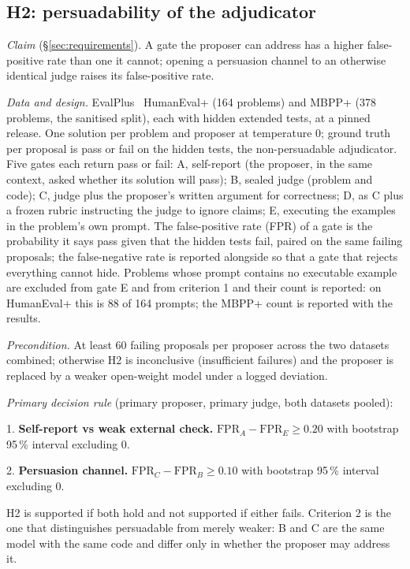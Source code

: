 
\subsection{H2: persuadability of the adjudicator}
\label{sec:h2}

\emph{Claim} (\S\ref{sec:requirements}). A gate the proposer can address has a higher false-positive rate than one it cannot; opening a persuasion channel to an otherwise identical judge raises its false-positive rate.

\emph{Data and design.} EvalPlus~\citep{evalplus} HumanEval+ (164 problems) and MBPP+ (378 problems, the sanitised split), each with hidden extended tests, at a pinned release. One solution per problem and proposer at temperature 0; ground truth per proposal is pass or fail on the hidden tests, the non-persuadable adjudicator. Five gates each return pass or fail: A, self-report (the proposer, in the same context, asked whether its solution will pass); B, sealed judge (problem and code); C, judge plus the proposer's written argument for correctness; D, as C plus a frozen rubric instructing the judge to ignore claims; E, executing the examples in the problem's own prompt. The false-positive rate (FPR) of a gate is the probability it says pass given that the hidden tests fail, paired on the same failing proposals; the false-negative rate is reported alongside so that a gate that rejects everything cannot hide. Problems whose prompt contains no executable example are excluded from gate E and from criterion 1 and their count is reported: on HumanEval+ this is 88 of 164 prompts; the MBPP+ count is reported with the results.

\emph{Precondition.} At least 60 failing proposals per proposer across the two datasets combined; otherwise H2 is inconclusive (insufficient failures) and the proposer is replaced by a weaker open-weight model under a logged deviation.

\emph{Primary decision rule} (primary proposer, primary judge, both datasets pooled):
\begin{prereg}
1. \textbf{Self-report vs weak external check.} $\mathrm{FPR}_A - \mathrm{FPR}_E \geq 0.20$ with bootstrap 95\,\% interval excluding 0.

2. \textbf{Persuasion channel.} $\mathrm{FPR}_C - \mathrm{FPR}_B \geq 0.10$ with bootstrap 95\,\% interval excluding 0.
\end{prereg}
H2 is supported if both hold and not supported if either fails. Criterion 2 is the one that distinguishes persuadable from merely weaker: B and C are the same model with the same code and differ only in whether the proposer may address it.


